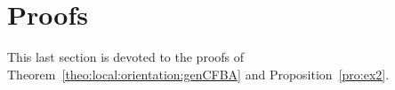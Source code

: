 \documentclass{elsarticle}
\newenvironment{proof}{\medskip\noindent{\bf Proof.}\;}{\null\hfill $\Box$\par\medskip }
\begin{document}




\section{Proofs}\label{s:proofs}
This last section is devoted to the proofs of Theorem~\ref{theo:local:orientation:genCFBA} and Proposition~\ref{pro:ex2}.
\end{document}
